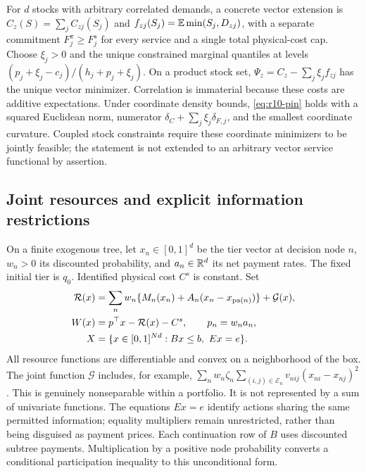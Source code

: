 For $d$ stocks with arbitrary correlated demands, a concrete vector extension is $C_z(S)=\sum_j C_{zj}(S_j)$ and $f_{zj}(S_j)=\mathbb E\min(S_j,D_{zj})$, with a separate commitment $F_j^\pi\geq F_j^s$ for every service and a single total physical-cost cap. Choose $\xi_j>0$ and the unique constrained marginal quantiles at levels $(p_j+\xi_j-c_j)/(h_j+p_j+\xi_j)$. On a product stock set, $\Psi_z=C_z-\sum_j\xi_j f_{zj}$ has the unique vector minimizer. Correlation is immaterial because these costs are additive expectations. Under coordinate density bounds, \eqref{eq:r10-pin} holds with a squared Euclidean norm, numerator $\delta_C+\sum_j\xi_j\delta_{F,j}$, and the smallest coordinate curvature. Coupled stock constraints require these coordinate minimizers to be jointly feasible; the statement is not extended to an arbitrary vector service functional by assertion.

\subsection{Joint resources and explicit information restrictions}
On a finite exogenous tree, let $x_n\in[0,1]^d$ be the tier vector at decision node $n$, $w_n>0$ its discounted probability, and $a_n\in\mathbb R^d$ its net payment rates. The fixed initial tier is $q_0$. Identified physical cost $C^s$ is constant. Set
\begin{align}
 \mathcal R(x)&=\sum_n w_n\{M_n(x_n)+A_n(x_n-x_{\mathrm{pa}(n)})\}+\mathcal G(x),\label{eq:r10-resource}\\
 W(x)&=p^\top x-\mathcal R(x)-C^s,\qquad p_n=w_na_n,\notag\\
 X&=\{x\in[0,1]^{Nd}: Bx\leq b,\ Ex=e\}.\label{eq:r10-poly}
\end{align}
All resource functions are differentiable and convex on a neighborhood of the box. The joint function $\mathcal G$ includes, for example, $\sum_n w_n\zeta_n\sum_{(i,j)\in\mathcal E_n}v_{nij}(x_{ni}-x_{nj})^2$. This is genuinely nonseparable within a portfolio. It is not represented by a sum of univariate functions. The equations $Ex=e$ identify actions sharing the same permitted information; equality multipliers remain unrestricted, rather than being disguised as payment prices. Each continuation row of $B$ uses discounted subtree payments. Multiplication by a positive node probability converts a conditional participation inequality to this unconditional form.

